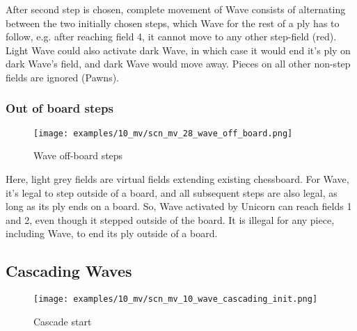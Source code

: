 After second step is chosen, complete movement of Wave consists of alternating between the two initially
chosen steps, which Wave for the rest of a ply has to follow, e.g. after reaching field 4, it cannot move
to any other step-field (red). Light Wave could also activate dark Wave, in which case it would end it's
ply on dark Wave's field, and dark Wave would move away. Pieces on all other non-step fields are ignored
(Pawns).

\clearpage %

\subsubsection*{Out of board steps}

\vspace*{-1.4\baselineskip}
\noindent
\begin{figure}[!h]
\texttt{[image: examples/10\_mv/scn\_mv\_28\_wave\_off\_board.png]}
\caption{Wave off-board steps}
\label{fig:scn_mv_28_wave_off_board}
\end{figure}

Here, light grey fields are virtual fields extending existing chessboard.
For Wave, it's legal to step outside of a board, and all subsequent steps
are also legal, as long as its ply ends on a board. So, Wave activated by
Unicorn can reach fields 1 and 2, even though it stepped outside of the
board. It is illegal for any piece, including Wave, to end its ply outside
of a board.

\clearpage %

\subsection*{Cascading Waves}

\vspace*{-3.0ex}
\noindent
\begin{figure}[h]
\texttt{[image: examples/10\_mv/scn\_mv\_10\_wave\_cascading\_init.png]}
\caption{Cascade start}
\label{fig:scn_mv_10_wave_cascading_init}
\end{figure}

